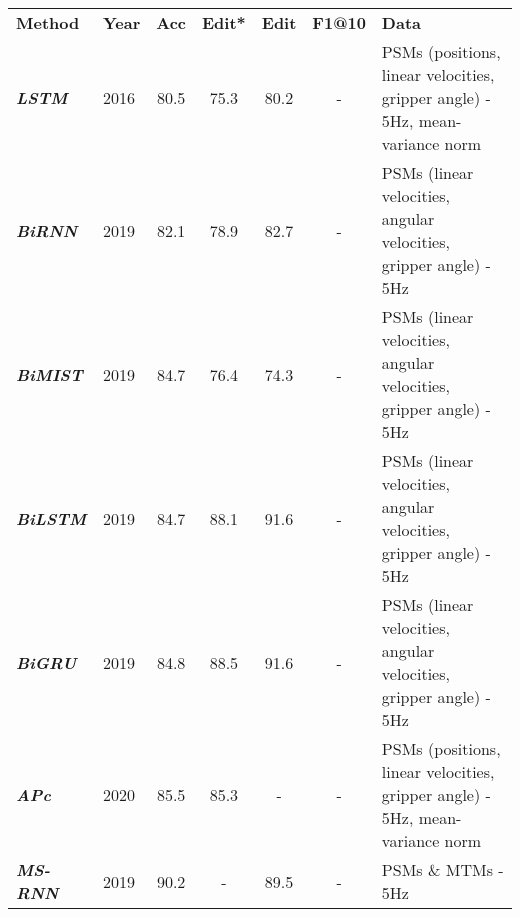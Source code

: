 \documentclass[journal]{IEEEtran}
\begin{document}
\begin{table*}[t!]
    \begin{threeparttable}
    	\begin{tabular}{m{2.3cm}|P{0.6cm}|c|c|c|c|m{9.0cm}}
            \hspace{0.45cm} \textbf{Method}  &\textbf{Year} &\bfseries Acc &\bfseries Edit* &\bfseries Edit &\bfseries F1@10  &\hspace{4.3cm} \textbf{Data} \\
    		 \textbf{\textit{LSTM}} \scriptsize \cite{dipietro2016, Lea2016tcnECCV} &2016 &80.5 &75.3 &80.2 &- &PSMs (positions, linear velocities, gripper angle) - 5Hz, mean-variance norm\\
    		 \textbf{\textit{BiRNN}} \scriptsize \cite{DiPietro2019}  &2019 &82.1 &78.9 &82.7  &-  &PSMs (linear velocities, angular velocities, gripper angle) - 5Hz \\
    		 \textbf{\textit{BiMIST}} \scriptsize \cite{DiPietro2019}  &2019 &84.7  &76.4 &74.3  &-  &PSMs (linear velocities, angular velocities, gripper angle) - 5Hz \\
    		 \textbf{\textit{BiLSTM}} \scriptsize \cite{DiPietro2019}  &2019 &84.7 &88.1 &91.6  &-  &PSMs (linear velocities, angular velocities, gripper angle) - 5Hz\\
    		 \textbf{\textit{BiGRU}} \scriptsize \cite{DiPietro2019}  &2019 &84.8 &88.5 &91.6  &-  &PSMs (linear velocities, angular velocities, gripper angle) - 5Hz \\
    		 \textbf{\textit{APc}} \scriptsize \cite{VanAmsterdam2020}  &2020 &85.5 &85.3 &-  &-  &PSMs (positions, linear velocities, gripper angle) - 5Hz, mean-variance norm  \\
    		 \textbf{\textit{MS-RNN}} \scriptsize \cite{Gurcan2019}  &2019 &90.2 &- &89.5 &-  &PSMs  \& MTMs - 5Hz \\

\end{tabular}
\end{threeparttable}
\end{table*}
\end{document}
